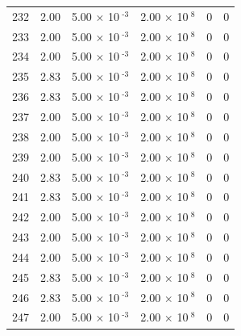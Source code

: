 \documentclass[a4paper,11pt]{article}
\begin{document}
\begin{center}
\begin{longtable}{|R{1.5cm}|R{2.4cm}|R{2.4cm}|R{2.4cm}|R{2.4cm}|R{2.4cm}|}
  232 &   2.00  &         5.00 $\times$ 10$^{\text{          -3}}$  &         2.00 $\times$ 10$^{\text{           8}}$  & 0  & 0 \\
  233 &   2.00  &         5.00 $\times$ 10$^{\text{          -3}}$  &         2.00 $\times$ 10$^{\text{           8}}$  & 0  & 0 \\
  234 &   2.00  &         5.00 $\times$ 10$^{\text{          -3}}$  &         2.00 $\times$ 10$^{\text{           8}}$  & 0  & 0 \\
  235 &   2.83  &         5.00 $\times$ 10$^{\text{          -3}}$  &         2.00 $\times$ 10$^{\text{           8}}$  & 0  & 0 \\
  236 &   2.83  &         5.00 $\times$ 10$^{\text{          -3}}$  &         2.00 $\times$ 10$^{\text{           8}}$  & 0  & 0 \\
  237 &   2.00  &         5.00 $\times$ 10$^{\text{          -3}}$  &         2.00 $\times$ 10$^{\text{           8}}$  & 0  & 0 \\
  238 &   2.00  &         5.00 $\times$ 10$^{\text{          -3}}$  &         2.00 $\times$ 10$^{\text{           8}}$  & 0  & 0 \\
  239 &   2.00  &         5.00 $\times$ 10$^{\text{          -3}}$  &         2.00 $\times$ 10$^{\text{           8}}$  & 0  & 0 \\
  240 &   2.83  &         5.00 $\times$ 10$^{\text{          -3}}$  &         2.00 $\times$ 10$^{\text{           8}}$  & 0  & 0 \\
  241 &   2.83  &         5.00 $\times$ 10$^{\text{          -3}}$  &         2.00 $\times$ 10$^{\text{           8}}$  & 0  & 0 \\
  242 &   2.00  &         5.00 $\times$ 10$^{\text{          -3}}$  &         2.00 $\times$ 10$^{\text{           8}}$  & 0  & 0 \\
  243 &   2.00  &         5.00 $\times$ 10$^{\text{          -3}}$  &         2.00 $\times$ 10$^{\text{           8}}$  & 0  & 0 \\
  244 &   2.00  &         5.00 $\times$ 10$^{\text{          -3}}$  &         2.00 $\times$ 10$^{\text{           8}}$  & 0  & 0 \\
  245 &   2.83  &         5.00 $\times$ 10$^{\text{          -3}}$  &         2.00 $\times$ 10$^{\text{           8}}$  & 0  & 0 \\
  246 &   2.83  &         5.00 $\times$ 10$^{\text{          -3}}$  &         2.00 $\times$ 10$^{\text{           8}}$  & 0  & 0 \\
  247 &   2.00  &         5.00 $\times$ 10$^{\text{          -3}}$  &         2.00 $\times$ 10$^{\text{           8}}$  & 0  & 0 \\

\end{longtable}
\end{center}
\end{document}
